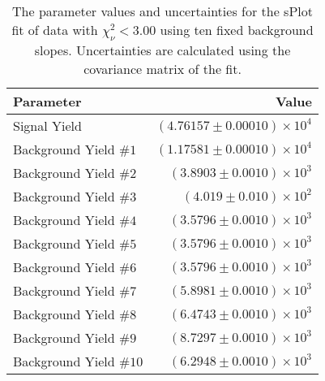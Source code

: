 
\begin{table}[ht]
    \begin{center}
        \begin{tabular}{lr}\toprule
            Parameter & Value \\\midrule
            Signal Yield & $(4.76157 \pm 0.00010) \times 10^{4}$ \\
            Background Yield $\#1$ & $(1.17581 \pm 0.00010) \times 10^{4}$ \\
            Background Yield $\#2$ & $(3.8903 \pm 0.0010) \times 10^{3}$ \\
            Background Yield $\#3$ & $(4.019 \pm 0.010) \times 10^{2}$ \\
            Background Yield $\#4$ & $(3.5796 \pm 0.0010) \times 10^{3}$ \\
            Background Yield $\#5$ & $(3.5796 \pm 0.0010) \times 10^{3}$ \\
            Background Yield $\#6$ & $(3.5796 \pm 0.0010) \times 10^{3}$ \\
            Background Yield $\#7$ & $(5.8981 \pm 0.0010) \times 10^{3}$ \\
            Background Yield $\#8$ & $(6.4743 \pm 0.0010) \times 10^{3}$ \\
            Background Yield $\#9$ & $(8.7297 \pm 0.0010) \times 10^{3}$ \\
            Background Yield $\#10$ & $(6.2948 \pm 0.0010) \times 10^{3}$ \\\bottomrule
        \end{tabular}
        \caption{The parameter values and uncertainties for the sPlot fit of data with $\chi^2_\nu < 3.00$ using ten fixed background slopes. Uncertainties are calculated using the covariance matrix of the fit.}\label{tab:splot-fit-results-chisqdof-3.00-fixed-10}
    \end{center}
\end{table}
